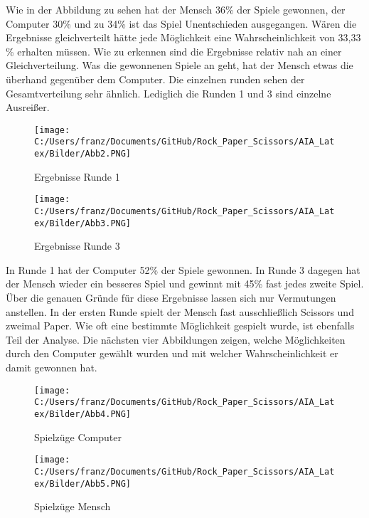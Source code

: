 \documentclass[thesis=paper,fancy]{hsmw-thesis}
\begin{document}
Wie in der Abbildung zu sehen hat der Mensch 36\% der Spiele gewonnen, der Computer 30\% und zu 34\% ist das Spiel Unentschieden ausgegangen. Wären die Ergebnisse gleichverteilt hätte jede Möglichkeit eine Wahrscheinlichkeit von 33,33 \% erhalten müssen. Wie zu erkennen sind die Ergebnisse relativ nah an einer Gleichverteilung. Was die gewonnenen Spiele an geht, hat der Mensch etwas die überhand gegenüber dem Computer.
Die einzelnen runden sehen der Gesamtverteilung sehr ähnlich. Lediglich die Runden 1 und 3 sind einzelne Ausreißer.

\begin{figure}[h]
   \begin{minipage}[b]{.45\linewidth} %
      \texttt{[image: C:/Users/franz/Documents/GitHub/Rock\_Paper\_Scissors/AIA\_Latex/Bilder/Abb2.PNG]}
      \caption{Ergebnisse Runde 1}
   \end{minipage}
   \hspace{.1\linewidth}%
   \begin{minipage}[b]{.45\linewidth} %
      \texttt{[image: C:/Users/franz/Documents/GitHub/Rock\_Paper\_Scissors/AIA\_Latex/Bilder/Abb3.PNG]}
      \caption{Ergebnisse Runde 3}
   \end{minipage}
\end{figure}
In Runde 1 hat der Computer 52\% der Spiele gewonnen. In Runde 3 dagegen hat der Mensch wieder ein besseres Spiel und gewinnt mit 45\% fast jedes zweite Spiel. Über die genauen Gründe für diese Ergebnisse lassen sich nur Vermutungen anstellen. In der ersten Runde spielt der Mensch fast ausschließlich Scissors und zweimal Paper. Wie oft eine bestimmte Möglichkeit gespielt wurde, ist ebenfalls Teil der Analyse. Die nächsten vier Abbildungen zeigen, welche Möglichkeiten durch den Computer gewählt wurden und mit welcher Wahrscheinlichkeit er damit gewonnen hat.
\begin{figure}[h]
   \begin{minipage}[b]{.45\linewidth} %
      \texttt{[image: C:/Users/franz/Documents/GitHub/Rock\_Paper\_Scissors/AIA\_Latex/Bilder/Abb4.PNG]}
      \caption{Spielzüge Computer}
   \end{minipage}
   \hspace{.1\linewidth}%
   \begin{minipage}[b]{.45\linewidth} %
      \texttt{[image: C:/Users/franz/Documents/GitHub/Rock\_Paper\_Scissors/AIA\_Latex/Bilder/Abb5.PNG]}
      \caption{Spielzüge Mensch}
   \end{minipage}
\end{figure}
\end{document}
